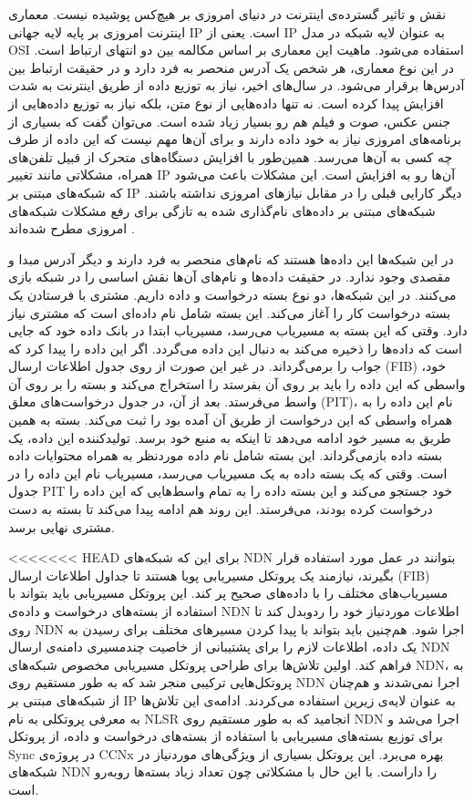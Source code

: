 

نقش و تاثیر گسترده‌ی اینترنت در دنیای امروزی بر هیچ‌کس پوشیده نیست. معماری اینترنت امروزی بر پایه لایه جهانی IP است. یعنی از IP به عنوان لایه شبکه در مدل OSI  استفاده می‌شود. ماهیت این معماری بر اساس مکالمه بین دو انتهای ارتباط است. در این نوع معماری، هر شخص یک آدرس منحصر به فرد دارد و در حقیقت ارتباط بین آدرس‌ها برقرار می‌شود. 
در سال‌های اخیر، نیاز به توزیع داده‌ از طریق اینترنت به شدت افزایش پیدا کرده است. نه تنها داده‌هایی از نوع متن، بلکه نیاز به توزیع داده‌هایی از جنس عکس، صوت و فیلم هم رو بسیار زیاد شده است. می‌توان گفت که بسیاری از برنامه‌های امروزی نیاز به خود داده دارند و برای آن‌ها مهم نیست که این داده از طرف چه کسی به آن‌ها می‌رسد. همین‌طور با افزایش دستگاه‌های متحرک از قبیل تلفن‌های همراه، مشکلاتی مانند تغییر IP آن‌ها رو به افزایش است. این مشکلات باعث می‌شود که شبکه‌‌های مبتنی بر IP دیگر کارایی قبلی را در مقابل نیازهای امروزی نداشته باشند. شبکه‌های مبتنی بر داده‌‌های نام‌گذاری شده به تازگی برای رفع مشکلات شبکه‌های امروزی مطرح شده‌اند
\cite{ndn}.

در این شبکه‌ها این داده‌ها هستند که نام‌های منحصر به فرد دارند و دیگر آدرس مبدا و مقصدی وجود ندارد. در حقیقت داده‌ها و نام‌‌های آن‌ها نقش اساسی را در شبکه بازی می‌کنند. در این شبکه‌ها، دو نوع بسته درخواست و داده داریم. مشتری با فرستادن یک بسته درخواست کار را آغاز می‌کند. این بسته شامل نام داده‌ای است که مشتری نیاز دارد. وقتی که این بسته به مسیریاب می‌رسد، مسیریاب ابتدا در بانک داده خود که جایی است که داده‌ها را ذخیره می‌کند به دنبال این داده می‌گردد. اگر این داده را پیدا کرد که جواب را برمی‌گرداند. در غیر این صورت از روی جدول اطلاعات ارسال (FIB) خود، واسطی که این داده را باید بر روی آن بفرستد را استخراج می‌کند و بسته را بر روی آن واسط می‌فرستد. بعد از آن، در جدول درخواست‌های معلق (PIT)، نام این داده را به همراه واسطی که این درخواست از طریق آن آمده بود را ثبت می‌کند. بسته به همین‌ طریق به مسیر خود ادامه می‌دهد تا اینکه به منبع خود برسد. تولیدکننده این داده، یک بسته داده بازمی‌گرداند. این بسته شامل نام داده موردنظر به همراه محتوایات داده است. وقتی که یک بسته داده به یک مسیریاب می‌رسد، مسیریاب نام این داده را در جدول PIT خود جستجو می‌کند و این بسته داده را به تمام واسط‌هایی که این داده را درخواست کرده بودند، می‌فرستد. این روند هم ادامه پیدا می‌کند تا بسته به دست مشتری نهایی برسد. 
 
<<<<<<< HEAD
برای این که شبکه‌های NDN بتوانند در عمل مورد استفاده قرار بگیرند، نیازمند یک پروتکل مسیریابی پویا هستند تا جداول اطلاعات ارسال (FIB) مسیریاب‌های مختلف را با داده‌های صحیح پر کند. این پروتکل مسیریابی باید بتواند با استفاده از بسته‌های درخواست و داده‌ی NDN اطلاعات موردنیاز خود را ردوبدل کند تا روی NDN اجرا شود. هم‌چنین باید بتواند با پیدا کردن مسیرهای مختلف برای رسیدن به یک داده، اطلاعات لازم را برای پشتیبانی از خاصیت چندمسیری دامنه‌ی ارسال NDN فراهم کند. اولین تلاش‌ها برای طراحی پروتکل مسیریابی مخصوص شبکه‌های NDN، به پروتکل‌هایی ترکیبی منجر شد که به طور مستقیم روی NDN اجرا نمی‌شدند و هم‌چنان از شبکه‌های مبتنی بر IP به عنوان لایه‌ی زیرین استفاده می‌کردند. ادامه‌ی این تلاش‌ها به معرفی پروتکلی به نام NLSR انجامید که به طور مستقیم روی NDN اجرا می‌شد و برای توزیع بسته‌های مسیریابی با استفاده از بسته‌های درخواست و داده، از پروتکل Sync در پروژه‌ی CCNx بهره می‌برد. این پروتکل بسیاری از ویژگی‌های موردنیاز در شبکه‌های NDN را داراست. با این حال با مشکلاتی چون تعداد زیاد بسته‌ها روبه‌رو است.

